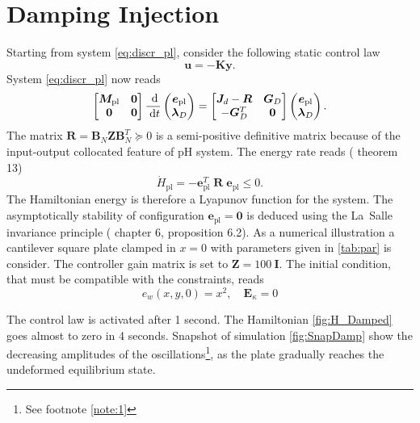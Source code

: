 \documentclass[letterpaper, 10 pt, conference]{ieeeconf}
\begin{document}
\section{Damping Injection}
\label{sec:Damp}
Starting from system \eqref{eq:discr_pl}, consider the following static control law
\begin{equation}
\bm{u} = -\bm{K} \bm{y}.
\end{equation}
System \eqref{eq:discr_pl} now reads
\begin{equation}
\begin{bmatrix}
\bm{M}_{\text{pl}} & \bm{0} \\
\bm{0} & \bm{0} \\
\end{bmatrix}\frac{\d}{\d t}
\begin{pmatrix}
\bm{e}_{\text{pl}}\\
\bm{\lambda}_D \\
\end{pmatrix}
= \begin{bmatrix}
\bm{J}_d - \bm{R} & \bm{G}_D \\
-\bm{G}_D^T & \bm{0} \\
\end{bmatrix}
\begin{pmatrix}
\bm{e}_{\text{pl}}\\
\bm{\lambda}_D \\
\end{pmatrix}.
\end{equation}
The matrix $\bm{R} = \bm{B}_N \bm{Z} \bm{B}_N^T \succcurlyeq 0$ is a semi-positive definitive matrix because of the input-output collocated feature of pH system. The energy rate reads (\cite{beattie2018linear} theorem 13)
\[\dot{H} _{\text{pl}} = - \bm{e}_{\text{pl}}^T \; \bm{R} \; \bm{e}_{\text{pl}} \le 0. \]
The Hamiltonian energy is therefore a Lyapunov function for the system. The asymptotically stability of configuration $\bm{e}_{\text{pl}} = \bm{0}$ is deduced using the La~Salle invariance principle (\cite{bookPHs}  chapter 6, proposition 6.2). As a numerical illustration a cantilever square plate clamped in $x=0$ with parameters given in \ref{tab:par} is consider. The controller gain matrix is set to $\bm{Z} = 100 \ \bm{I}$. The initial condition, that must be compatible with the constraints, reads
\[e_w(x,y,0) = x^2, \quad \bm{E}_{\kappa}=0\]

 The control law is activated after 1 second. The Hamiltonian \ref{fig:H_Damped} goes almost to zero in 4 seconds. Snapshot of simulation \ref{fig:SnapDamp} show the decreasing amplitudes of the oscillations\footnote{See footnote \ref{note:1}}, as the plate gradually reaches the undeformed equilibrium state.
\end{document}
